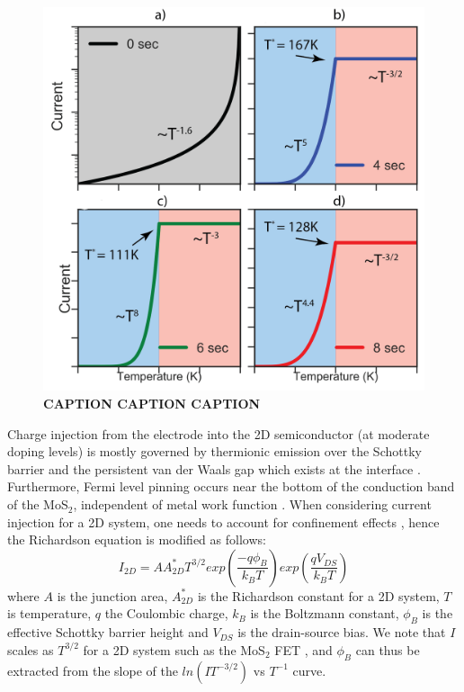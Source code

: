 \documentclass[%
 aip,
 jmp,%
 amsmath,amssymb,
 reprint,%
]{revtex4-1}
\begin{document}
{\setlength\intextsep{5pt}
\begin{figure}
\centering
\includegraphics[width=\columnwidth]{Fig_5.png}
\caption{{\footnotesize \textbf{CAPTION CAPTION CAPTION}}}
\label{fig:electrical}
\end{figure}}

\indent Charge injection from the electrode into the 2D semiconductor (at moderate doping levels) is mostly governed by thermionic emission over the Schottky barrier and the persistent van der Waals gap which exists at the interface \cite{allain2015electrical}. Furthermore, Fermi level pinning occurs near the bottom of the conduction band of the MoS$_2$, independent of metal work function \cite{kim2017fermi}. When considering current injection for a 2D system, one needs to account for confinement effects \cite{anwar1999effects}, hence the Richardson equation is modified as follows:
\begin{equation}
\displaystyle I_{2D} = AA^{*}_{2D} T^{3/2} exp\left( \frac{-q \phi_B}{k_B T} \right) exp\left( \frac{q V_{DS}}{k_B T} \right)
\end{equation}where $A$ is the junction area, $A^{*}_{2D}$ is the Richardson constant for a 2D system, $T$ is temperature, $q$ the Coulombic charge, $k_B$ is the Boltzmann constant, $\phi_B$ is the effective Schottky barrier height and $V_{DS}$ is the drain-source bias. We note that $I$ scales as $T^{3/2}$ for a 2D system such as the MoS$_2$ FET \cite{wang2016high,kim2017fermi,somvanshi2017nature}, and $\phi_B$ can thus be extracted from the slope of the $ln(IT^{-3/2})$ vs $T^{-1}$ curve.

\clearpage 




\end{document}
